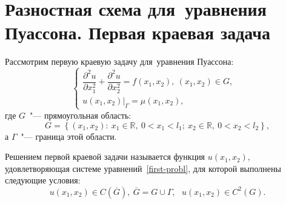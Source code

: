 \documentclass[11pt,a4paper,twoside,listtotoc,bibtotoc]{report}
\numberwithin{equation}{section}
\theoremstyle{definition}
\theoremstyle{plain}
\begin{document}
%
\section{Разностная схема для~уравнения Пуассона. Первая краевая задача}
%
\label{paragraph-6-ref}
Рассмотрим первую краевую задачу для~уравнения Пуассона:
%
\begin{equation}
    \label{first-probl}
    \begin{cases}
        \dfrac{\partial^2u}{\partial x_1^2} + \dfrac{\partial^2u}{\partial x_2^2}
            = f(x_1, x_2),~(x_1, x_2) \in G,\\[.2em]
        \left.u(x_1, x_2)\right\vert_{\Gamma} = \mu(x_1, x_2), &
    \end{cases}
\end{equation}
%
где $G$~"--- прямоугольная область:
%
$$
    G = \left\{(x_1, x_2)\colon~x_1 \in \mathbb{R},~0 < x_1 < l_1;
    ~x_2\in\mathbb{R},~0 < x_2 < l_2\right\},
$$
%
а $\Gamma$~"--- граница этой области.

Решением первой краевой задачи называется функция $u(x_1,x_2)$, удовлетворяющая
системе уравнений~\eqref{first-probl}, для которой выполнены следующие условия:
%
$$
    u(x_1,x_2)\in C\left(\overline{G}\right),~\overline{G} = G\cup\Gamma,~~~
    u(x_1,x_2) \in C^{2}(G).
$$
%
\end{document}
